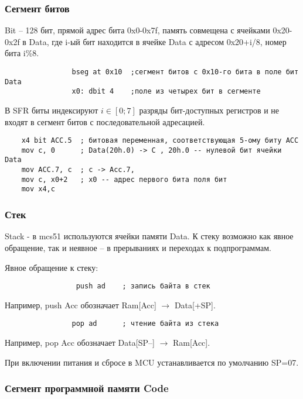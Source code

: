\documentclass[12pt, a4paper] {ncc}
\begin{document}
        \subsubsection{Сегмент битов}
            Bit – 128 бит, прямой адрес бита 0x0-0x7f, память совмещена с ячейками 0x20-0x2f в Data, где i-ый бит
            находится в ячейке Data с адресом 0x20+i/8, номер бита i\%8.
            \begin{verbatim}
                bseg at 0x10  ;сегмент битов с 0x10-го бита в поле бит Data
                x0: dbit 4    ;поле из четырех бит в сегменте
            \end{verbatim}

            В SFR биты индексируют $i \in [0;7]$ разряды бит-доступных регистров и не входят в сегмент битов
            с последовательной адресацией.
            \begin{verbatim}
    x4 bit ACC.5  ; битовая переменная, соответствующая 5-ому биту АСС
    mov c, 0      ; Data(20h.0) -> С , 20h.0 -- нулевой бит ячейки Data
    mov ACC.7, c  ; c -> Acc.7,
    mov c, x0+2   ; x0 -- адрес первого бита поля бит
    mov x4,c
            \end{verbatim}
        \subsubsection{Стек}
            Stack  - в mcs51 используются ячейки памяти Data. К стеку возможно как явное обращение, так и неявное --
            в прерываниях и переходах к подпрограммам.

            Явное обращение к стеку:
            \begin{verbatim}
                 push ad    ; запись байта в стек
            \end{verbatim}
            Например, push Acc обозначает Ram[Acc] $ \to $ Data[+SP].
            \begin{verbatim}
                pop ad      ; чтение байта из стека
            \end{verbatim}
            Например,  pop Acc  обозначает Data[SP--] $ \to $ Ram[Acc].

            При включении питания и сбросе в MCU устанавливается по умолчанию SP=07.

        \subsubsection{Сегмент программной памяти Code}
\end{document}
